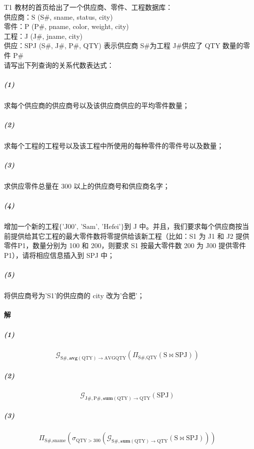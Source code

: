 \documentclass{article}
\makeatletter
\renewcommand{\section}{\@startsection{section}{1}{0mm}
                                {-5ex plus -.5ex minus -.2ex}
                                {3ex plus .2ex}
                                {\normalfont\large\bfseries}}
\makeatother
\begin{document}
\section{T1 教材的首页给出了一个供应商、零件、工程数据库：
\protect\\ \indent 供应商：S (S\#, sname, status, city)
\protect\\ \indent 零件：P (P\#, pname, color, weight, city)
\protect\\ \indent 工程：J (J\#, jname, city)
\protect\\ \indent 供应：SPJ (S\#, J\#, P\#, QTY) 表示供应商 S\#为工程 J\#供应了 QTY 数量的零件 P\#
\protect\\ 请写出下列查询的关系代数表达式：}
\subparagraph{(1)} 求每个供应商的供应商号以及该供应商供应的平均零件数量；
\subparagraph{(2)} 求每个工程的工程号以及该工程中所使用的每种零件的零件号以及数量；
\subparagraph{(3)} 求供应零件总量在 300 以上的供应商号和供应商名字；
\subparagraph{(4)} 增加一个新的工程$\{\text{'J00'},\, \text{'Sam'},\, \text{'Hefei'}\}$到 J 中。并且，我们要求每个供应商按当前提供给其它工程的最大零件数将零提供给该新工程（比如：S1 为 J1 和 J2 提供零件P1，数量分别为 100 和 200，则要求 S1 按最大零件数 200 为 J00 提供零件 P1），请将相应信息插入到 SPJ 中；
\subparagraph{(5)} 将供应商号为'S1'的供应商的 city 改为'合肥'；

\paragraph{解}
\subparagraph{(1)}
\begin{Large}
\begin{equation*}
    \mathcal{G}_{\text{S\#}, \textbf{avg}(\text{QTY}) \rightarrow \text{AVGQTY}}(\Pi_{\text{S\#}, \text{QTY}}(\text{S} \Join \text{SPJ}))
\end{equation*}
\end{Large}

\subparagraph{(2)}
\begin{Large}
\begin{equation*}
    \mathcal{G}_{\text{J\#}, \text{P\#}, \textbf{sum}(\text{QTY}) \rightarrow \text{QTY}}(\text{SPJ})
\end{equation*}
\end{Large}

\subparagraph{(3)}
\begin{Large}
\begin{equation*}
    \Pi_{\text{S\#}, \text{sname}}(\sigma_{\text{QTY} > 300}(\mathcal{G}_{\text{S\#}, \textbf{sum}(\text{QTY}) \rightarrow \text{QTY}}(\text{S} \Join \text{SPJ})))
\end{equation*}
\end{Large}
\end{document}
